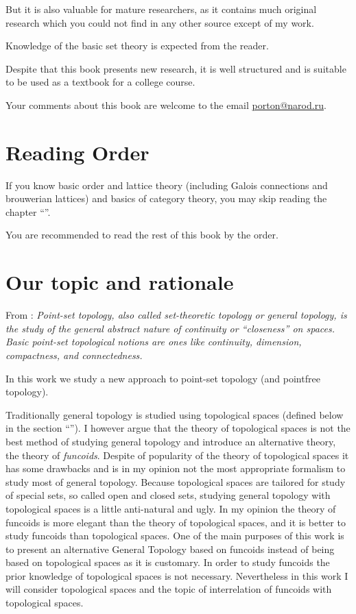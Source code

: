 But it is also valuable for mature researchers, as it contains much
original research which you could not find in any other source except
of my work.

Knowledge of the basic set theory is expected from the reader.

Despite that this book presents new research, it is well structured
and is suitable to be used as a textbook for a college course.

Your comments about this book are welcome to the email \href{mailto:porton@narod.ru}{porton@narod.ru}.


\section{Reading Order }

If you know basic order and lattice theory (including Galois connections
and brouwerian lattices) and basics of category theory, you may skip
reading the chapter ``''.

You are recommended to read the rest of this book by the order.


\section{Our topic and rationale}

From \cite{mw-gen-top}: \emph{Point-set topology, also called set-theoretic
topology or general topology, is the study of the general abstract
nature of continuity or ``closeness'' on spaces. Basic point-set
topological notions are ones like continuity, dimension, compactness,
and connectedness.}

In this work we study a new approach to point-set topology (and pointfree
topology).

Traditionally general topology is studied using topological spaces
(defined below in the section ``''). I however
argue that the theory of topological spaces is not the best method
of studying general topology and introduce an alternative theory,
the theory of \emph{funcoids}. Despite of popularity of the theory
of topological spaces it has some drawbacks and is in my opinion not
the most appropriate formalism to study most of general topology.
Because topological spaces are tailored for study of special sets,
so called open and closed sets, studying general topology with topological
spaces is a little anti-natural and ugly. In my opinion the theory
of funcoids is more elegant than the theory of topological spaces,
and it is better to study funcoids than topological spaces. One of
the main purposes of this work is to present an alternative General
Topology based on funcoids instead of being based on topological spaces
as it is customary. In order to study funcoids the prior knowledge
of topological spaces is not necessary. Nevertheless in this work
I will consider topological spaces and the topic of interrelation
of funcoids with topological spaces.

